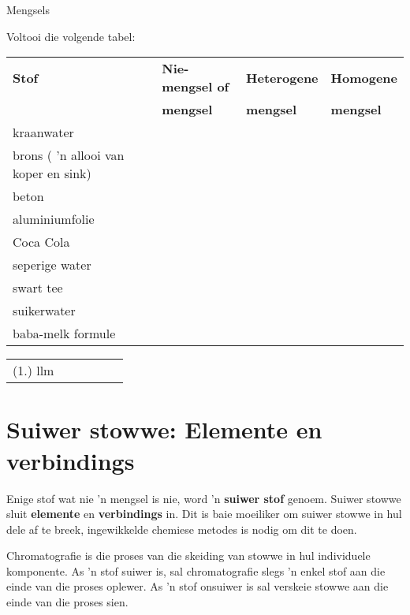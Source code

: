 \begin{exercises}{Mengsels}
{Voltooi die volgende tabel: \par
\begin{tabular}{|l|p{2.5cm}|p{2.5cm}|p{2.5cm}|}\hline
\textbf{Stof} & \textbf{Nie-mengsel of} & \textbf{Heterogene} & \textbf{Homogene} \\ 
 & \textbf{mengsel} & \textbf{mengsel} & \textbf{mengsel} \\ \hline
kraanwater & & & \\ \hline
brons ( 'n allooi van koper en sink) & & & \\ \hline
beton & & & \\ \hline
aluminiumfolie & & & \\ \hline
Coca Cola & & & \\ \hline
seperige water & & & \\ \hline
swart tee & & & \\ \hline
suikerwater & & & \\ \hline
baba-melk formule & & & \\ \hline
\end{tabular}

\practiceinfo
\begin{tabular}[h]{cccccc}
 (1.) llm  &
\end{tabular} 
}
\end{exercises}


\section{Suiwer stowwe: Elemente en verbindings}
\nopagebreak
Enige stof wat nie 'n mengsel is nie, word 'n \textbf{suiwer stof} genoem. Suiwer stowwe sluit \textbf{elemente} en \textbf{verbindings} in. Dit is baie moeiliker om suiwer stowwe in hul dele af te breek, ingewikkelde chemiese metodes is nodig om dit te doen.\par


Chromatografie is die proses van die skeiding van stowwe in hul individuele komponente. As 'n stof suiwer is, sal chromatografie slegs 'n enkel stof aan die einde van die proses oplewer. As 'n stof onsuiwer is sal verskeie stowwe aan die einde van die proses sien.\par

